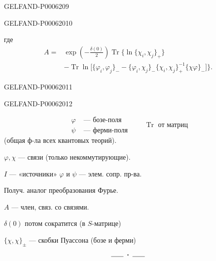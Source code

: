 \begin{GelfandAdjacentEvidence}{GELFAND-P000620}{9}

\end{GelfandAdjacentEvidence}
\begin{GelfandAdjacentEvidence}{GELFAND-P000620}{10}


где
\[
\begin{aligned}
A={}&\exp\left(-\frac{\delta(0)}2\right)\operatorname{Tr}
\bigl\{\ln\{\chi_i,\chi_j\}_+\bigr\}\\
&-\operatorname{Tr}\ln\bigl[\{\varphi_i,\varphi_j\}_-
-\{\varphi_i,\chi_j\}_-\{\chi_i,\chi_j\}_+^{-1}\{\chi\varphi\}_-\bigr]\Bigr\}.
\end{aligned}
\]
\end{GelfandAdjacentEvidence}
\begin{GelfandAdjacentEvidence}{GELFAND-P000620}{11}

\end{GelfandAdjacentEvidence}
\begin{GelfandAdjacentEvidence}{GELFAND-P000620}{12}

\end{GelfandAdjacentEvidence}

\[
\begin{aligned}
\varphi&\text{ — бозе-поля}\\
\psi&\text{ — ферми-поля}
\end{aligned}
\qquad \operatorname{Tr}\text{ от матриц}
\]
(общая ф-ла всех квантовых теорий).

\(\varphi,\chi\) — связи (только некоммутирующие).

\(I\) — «источники» \(\varphi\) и \(\psi\) — элем. сопр. пр-ва.

Получ. аналог преобразования Фурье.

\(A\) — член, связ. со связями.

\(\delta(0)\) потом сократится (в \(S\)-матрице)

\(\{\chi,\chi\}_{\pm}\) — скобки Пуассона (бозе и ферми)
\[\rule{1.8em}{.4pt}\;\boldsymbol{\cdot}\;\rule{1.8em}{.4pt}\]


